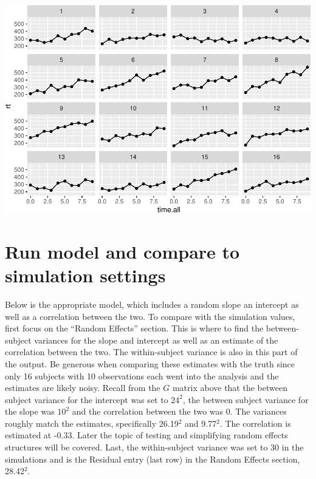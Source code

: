 \documentclass[
]{book}
\begin{document}
\includegraphics{1_video3_2_level_illustration_files/figure-latex/unnamed-chunk-2-1.pdf}

\hypertarget{run-model-and-compare-to-simulation-settings}{%
\section*{Run model and compare to simulation settings}\label{run-model-and-compare-to-simulation-settings}}

Below is the appropriate model, which includes a random slope an intercept as well as a correlation between the two. To compare with the simulation values, first focus on the ``Random Effects'' section. This is where to find the between-subject variances for the slope and intercept as well as an estimate of the correlation between the two. The within-subject variance is also in this part of the output. Be generous when comparing these estimates with the truth since only 16 subjects with 10 observations each went into the analysis and the estimates are likely noisy. Recall from the \(G\) matrix above that the between subject variance for the intercept was set to \(24^2\), the between subject variance for the slope was \(10^2\) and the correlation between the two was 0. The variances roughly match the estimates, specifically 26.19\(^2\) and 9.77\(^2\). The correlation is estimated at -0.33. Later the topic of testing and simplifying random effects structures will be covered. Last, the within-subject variance was set to 30 in the simulations and is the Residual entry (last row) in the Random Effects section, 28.42\(^2\).
\end{document}
